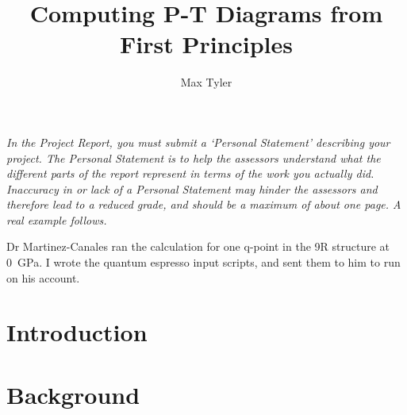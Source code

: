 \documentclass[12pt]{article}
\begin{document}
\title{Computing P-T Diagrams from First Principles} %
\author{Max Tyler} %

\begin{abstract}
\end{abstract}

\maketitle

\personalstatement

\textit{In the Project Report, you must submit a `Personal Statement' describing your project. The Personal Statement is to help the assessors understand what the different parts of the report represent in terms of the work you actually did. Inaccuracy in or lack of a Personal Statement may hinder the assessors and therefore lead to a reduced grade, and should be a maximum of about one page.  A real example follows.}


\acknowledgments

Dr Martinez-Canales ran the calculation for one q-point in the 9R structure at \SI{0}{\giga\pascal}. I wrote the quantum espresso input scripts, and sent them to him to run on his account.
\maintext


\section{Introduction}

\section{Background}
\end{document}
